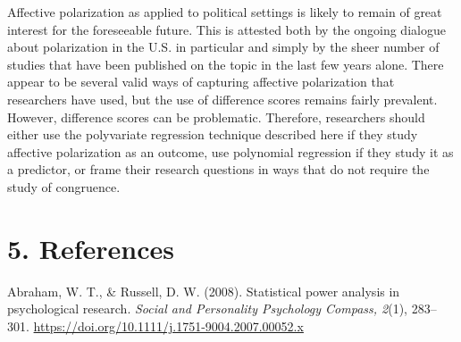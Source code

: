 \documentclass[authordate, meta]{jote-new-article}
\begin{document}
	Affective polarization as applied to political settings is likely to remain of great interest for the foreseeable future. This is attested both by the ongoing dialogue about polarization in the U.S. in particular and simply by the sheer number of studies that have been published on the topic in the last few years alone. There appear to be several valid ways of capturing affective polarization that researchers have used, but the use of difference scores remains fairly prevalent. However, difference scores can be problematic. Therefore, researchers should either use the polyvariate regression technique described here if they study affective polarization as an outcome, use polynomial regression if they study it as a predictor, or frame their research questions in ways that do not require the study of congruence.



































































	\section{5. References}



	Abraham, W. T., \& Russell, D. W. (2008). Statistical power analysis in psychological research. \emph{Social and Personality Psychology Compass, 2}(1), 283--301. \url{https://doi.org/10.1111/j.1751-9004.2007.00052.x}  
\end{document}
